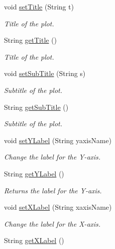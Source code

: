 \begin{DoxyCompactItemize}
void \hyperlink{classbridges_1_1base_1_1_line_chart_a893519da804666988c49b918c87da2a2}{set\+Title} (String t)
\begin{DoxyCompactList}\small\item\em Title of the plot. \end{DoxyCompactList}\item 
String \hyperlink{classbridges_1_1base_1_1_line_chart_aedc5f75b158298b755ba0c31bcf84138}{get\+Title} ()
\begin{DoxyCompactList}\small\item\em Title of the plot. \end{DoxyCompactList}\item 
void \hyperlink{classbridges_1_1base_1_1_line_chart_ad24bfdd49194f8e152fdb80e039762ad}{set\+Sub\+Title} (String s)
\begin{DoxyCompactList}\small\item\em Subtitle of the plot. \end{DoxyCompactList}\item 
String \hyperlink{classbridges_1_1base_1_1_line_chart_a102006e90f2a226886538db0eeda6b08}{get\+Sub\+Title} ()
\begin{DoxyCompactList}\small\item\em Subtitle of the plot. \end{DoxyCompactList}\item 
void \hyperlink{classbridges_1_1base_1_1_line_chart_adddccbe77ebd2590f426fab9c8227457}{set\+Y\+Label} (String yaxis\+Name)
\begin{DoxyCompactList}\small\item\em Change the label for the Y-\/axis. \end{DoxyCompactList}\item 
String \hyperlink{classbridges_1_1base_1_1_line_chart_ad3ae17da720b1f89406ab742379ddfd6}{get\+Y\+Label} ()
\begin{DoxyCompactList}\small\item\em Returns the label for the Y-\/axis. \end{DoxyCompactList}\item 
void \hyperlink{classbridges_1_1base_1_1_line_chart_ab402a1134bb79919860368a234f62ea2}{set\+X\+Label} (String xaxis\+Name)
\begin{DoxyCompactList}\small\item\em Change the label for the X-\/axis. \end{DoxyCompactList}\item 
String \hyperlink{classbridges_1_1base_1_1_line_chart_a0885f5c62f950d96397b1704da6e2798}{get\+X\+Label} ()

\end{DoxyCompactItemize}
